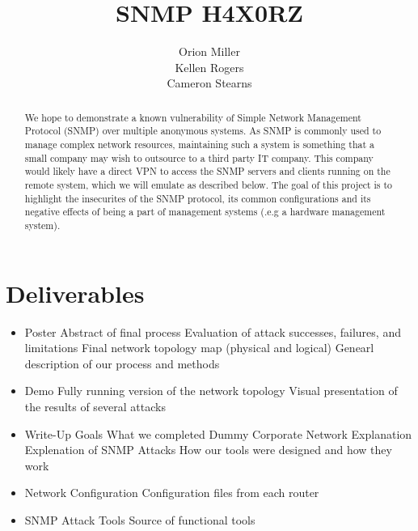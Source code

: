 \documentclass[11pt]{article}
\title{SNMP H4X0RZ}
\author{Orion Miller \\ Kellen Rogers \\ Cameron Stearns}
\begin{document}
\singlespace

\maketitle



\begin{abstract}
We hope to demonstrate a known vulnerability of Simple Network Management 
Protocol (SNMP) over multiple anonymous systems.  As SNMP is commonly used 
to manage complex network resources, maintaining such a system is something 
that a small company may wish to outsource to a third party IT company.  
This company would likely have a direct VPN to access the SNMP servers and 
clients running on the remote system, which we will emulate as described below. 
The goal of this project is to highlight the insecurites of the SNMP protocol,
its common configurations and its negative effects of being a part of 
management systems (.e.g a hardware management system).
\end{abstract}


\setcounter{secnumdepth}{2}

\section{Deliverables}

\begin{itemize}
\item Poster
  \subitem Abstract of final process
  \subitem Evaluation of attack successes, failures, and limitations
  \subitem Final network topology map (physical and logical)
  \subitem Genearl description of our process and methods

\item Demo
  \subitem Fully running version of the network topology %
  \subitem Visual presentation of the results of several attacks

\item Write-Up
  \subitem Goals
  \subitem What we completed
  \subitem Dummy Corporate Network Explanation
  \subitem Explenation of SNMP Attacks
  \subitem How our tools were designed and how they work

\item Network Configuration
  \subitem Configuration files from each router

\item SNMP Attack Tools
  \subitem Source of functional tools


\end{itemize}
\end{document}
